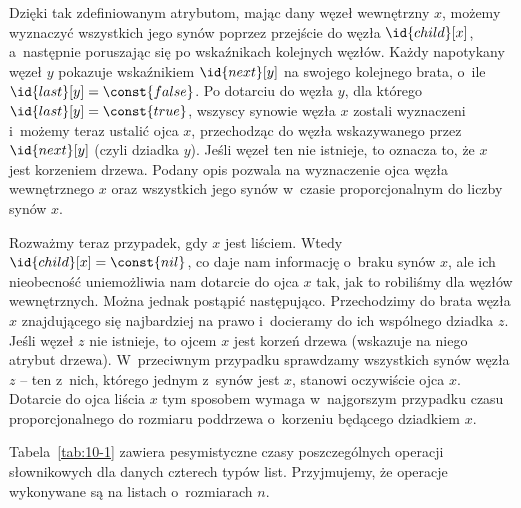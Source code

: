 Dzięki tak zdefiniowanym atrybutom, mając dany węzeł wewnętrzny $x$, możemy wyznaczyć wszystkich jego synów poprzez przejście do węzła $\id{child}[x]$, a~następnie poruszając się po wskaźnikach  kolejnych węzłów. Każdy napotykany węzeł $y$ pokazuje wskaźnikiem $\id{next}[y]$ na swojego kolejnego brata, o~ile $\id{last}[y]=\const{false}$. Po dotarciu do węzła $y$, dla którego $\id{last}[y]=\const{true}$, wszyscy synowie węzła $x$ zostali wyznaczeni i~możemy teraz ustalić ojca $x$, przechodząc do węzła wskazywanego przez $\id{next}[y]$ (czyli dziadka $y$). Jeśli węzeł ten nie istnieje, to oznacza to, że $x$ jest korzeniem drzewa. Podany opis pozwala na wyznaczenie ojca węzła wewnętrznego $x$ oraz wszystkich jego synów w~czasie proporcjonalnym do liczby synów $x$.

Rozważmy teraz przypadek, gdy $x$ jest liściem. Wtedy $\id{child}[x]=\const{nil}$, co daje nam informację o~braku synów $x$, ale ich nieobecność uniemożliwia nam dotarcie do ojca $x$ tak, jak to robiliśmy dla węzłów wewnętrznych. Można jednak postąpić następująco. Przechodzimy do brata węzła $x$ znajdującego się najbardziej na prawo i~docieramy do ich wspólnego dziadka $z$. Jeśli węzeł $z$ nie istnieje, to ojcem $x$ jest korzeń drzewa (wskazuje na niego atrybut  drzewa). W~przeciwnym przypadku sprawdzamy wszystkich synów węzła $z$ -- ten z~nich, którego jednym z~synów jest $x$, stanowi oczywiście ojca $x$. Dotarcie do ojca liścia $x$ tym sposobem wymaga w~najgorszym przypadku czasu proporcjonalnego do rozmiaru poddrzewa o~korzeniu będącego dziadkiem $x$.

\problems

Tabela~\ref{tab:10-1} zawiera pesymistyczne czasy poszczególnych operacji słownikowych dla danych czterech typów list. Przyjmujemy, że operacje wykonywane są na listach o~rozmiarach $n$.

